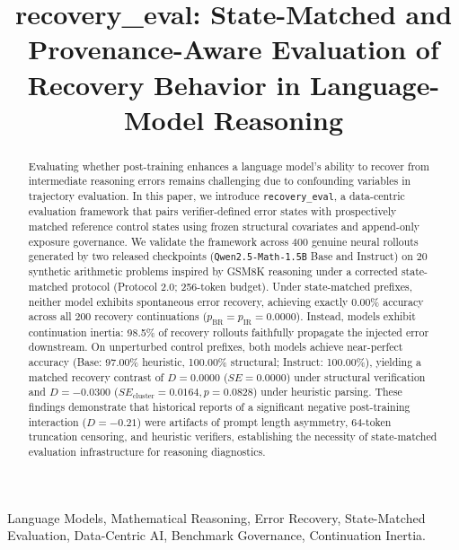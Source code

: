 \documentclass[10pt,conference]{IEEEtran}
\begin{document}
\title{recovery\_eval: State-Matched and Provenance-Aware Evaluation of Recovery Behavior in Language-Model Reasoning}

\author{
}

\maketitle

\begin{abstract}
Evaluating whether post-training enhances a language model's ability to recover from intermediate reasoning errors remains challenging due to confounding variables in trajectory evaluation. In this paper, we introduce \texttt{recovery\_eval}, a data-centric evaluation framework that pairs verifier-defined error states with prospectively matched reference control states using frozen structural covariates and append-only exposure governance. We validate the framework across 400 genuine neural rollouts generated by two released checkpoints (\texttt{Qwen2.5-Math-1.5B} Base and Instruct) on 20 synthetic arithmetic problems inspired by GSM8K reasoning under a corrected state-matched protocol (Protocol 2.0; 256-token budget). Under state-matched prefixes, neither model exhibits spontaneous error recovery, achieving exactly 0.00\% accuracy across all 200 recovery continuations ($p_{\text{BR}} = p_{\text{IR}} = 0.0000$). Instead, models exhibit continuation inertia: 98.5\% of recovery rollouts faithfully propagate the injected error downstream. On unperturbed control prefixes, both models achieve near-perfect accuracy (Base: 97.00\% heuristic, 100.00\% structural; Instruct: 100.00\%), yielding a matched recovery contrast of $D = 0.0000$ ($SE = 0.0000$) under structural verification and $D = -0.0300$ ($SE_{\text{cluster}} = 0.0164, p = 0.0828$) under heuristic parsing. These findings demonstrate that historical reports of a significant negative post-training interaction ($D = -0.21$) were artifacts of prompt length asymmetry, 64-token truncation censoring, and heuristic verifiers, establishing the necessity of state-matched evaluation infrastructure for reasoning diagnostics.
\end{abstract}

\begin{IEEEkeywords}
Language Models, Mathematical Reasoning, Error Recovery, State-Matched Evaluation, Data-Centric AI, Benchmark Governance, Continuation Inertia.
\end{IEEEkeywords}
\end{document}
